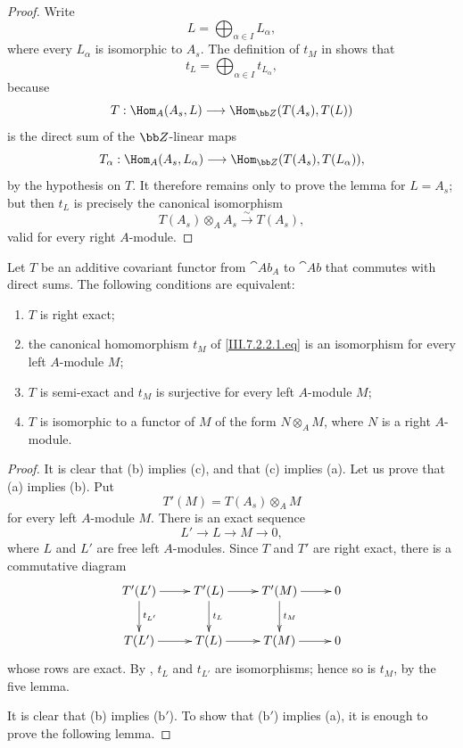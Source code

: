 \begin{proof}
Write
\[
  L=\bigoplus_{\alpha\in I}L_\alpha,
\]
where every $L_\alpha$ is isomorphic to $A_s$.  The definition
of $t_M$ in  shows that
\[
  t_L=\bigoplus_{\alpha\in I}t_{L_\alpha},
\]
because
\[
  T:
  \Hom_A(A_s,L)
  \longrightarrow
  \Hom_{\bb Z}(T(A_s),T(L))
\]
is the direct sum of the $\bb Z$-linear maps
\[
  T_\alpha:
  \Hom_A(A_s,L_\alpha)
  \longrightarrow
  \Hom_{\bb Z}(T(A_s),T(L_\alpha)),
\]
by the hypothesis on $T$.  It therefore remains only to prove
the lemma for $L=A_s$; but then $t_L$ is precisely the canonical
isomorphism
\[
  T(A_s)\otimes_A A_s
  \xrightarrow{\sim}
  T(A_s),
\]
valid for every right $A$-module.
\end{proof}

\begin{proposition}[7.2.5]
\label{III.7.2.5}
Let $T$ be an additive covariant functor from $\cat{Ab}_A$ to
$\cat{Ab}$ that commutes with direct sums.  The following
conditions are equivalent:
\begin{enumerate}
  \item[(a)] $T$ is right exact;
  \item[(b)] the canonical homomorphism $t_M$ of
    \eqref{III.7.2.2.1.eq} is an isomorphism for every left
    $A$-module $M$;
  \item[($\mathrm{b}'$)] $T$ is semi-exact and $t_M$ is
    surjective for every left $A$-module $M$;
  \item[(c)] $T$ is isomorphic to a functor of $M$ of the form
    $N\otimes_A M$, where $N$ is a right $A$-module.
\end{enumerate}
\end{proposition}

\begin{proof}
It is clear that (b) implies (c), and that (c) implies (a).
Let us prove that (a) implies (b).  Put
\[
  T'(M)=T(A_s)\otimes_A M
\]
for every left $A$-module $M$.  There is an exact sequence
\[
  L'\longrightarrow L\longrightarrow M\longrightarrow0,
\]
where $L$ and $L'$ are free left $A$-modules.  Since $T$ and
$T'$ are right exact, there is a commutative diagram
\[
\xymatrix{
  T'(L')\ar[r]\ar[d]^{t_{L'}}
  & T'(L)\ar[r]\ar[d]^{t_L}
  & T'(M)\ar[r]\ar[d]^{t_M}
  & 0
  \\
  T(L')\ar[r]
  & T(L)\ar[r]
  & T(M)\ar[r]
  & 0
}
\]
whose rows are exact.  By , $t_L$ and
$t_{L'}$ are isomorphisms; hence so is $t_M$, by the five
lemma.

It is clear that (b) implies ($\mathrm{b}'$).  To show that
($\mathrm{b}'$) implies (a), it is enough to prove the following
lemma.
\end{proof}

